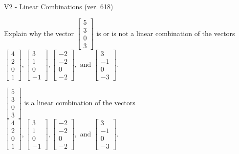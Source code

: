 \begin{exercise}
  \begin{exerciseTitle}V2 - Linear Combinations (ver. 618)\end{exerciseTitle}
  \begin{exerciseStatement}
    Explain why the vector \(\left[\begin{array}{c}
5 \\
3 \\
0 \\
3
\end{array}\right]\)  is or is not a linear 
	combination of the vectors \(\left[\begin{array}{c}
4 \\
2 \\
0 \\
1
\end{array}\right] , \left[\begin{array}{c}
3 \\
1 \\
0 \\
-1
\end{array}\right] , \left[\begin{array}{c}
-2 \\
-2 \\
0 \\
-2
\end{array}\right] , \text{ and } \left[\begin{array}{c}
3 \\
-1 \\
0 \\
-3
\end{array}\right]\).
	


  \end{exerciseStatement}
  \begin{exerciseAnswer}
   \(\left[\begin{array}{c}
5 \\
3 \\
0 \\
3
\end{array}\right]\) 
  	 is  
	a linear combination of the vectors \(\left[\begin{array}{c}
4 \\
2 \\
0 \\
1
\end{array}\right] , \left[\begin{array}{c}
3 \\
1 \\
0 \\
-1
\end{array}\right] , \left[\begin{array}{c}
-2 \\
-2 \\
0 \\
-2
\end{array}\right] , \text{ and } \left[\begin{array}{c}
3 \\
-1 \\
0 \\
-3
\end{array}\right]\).


\end{exerciseAnswer}
\end{exercise}
